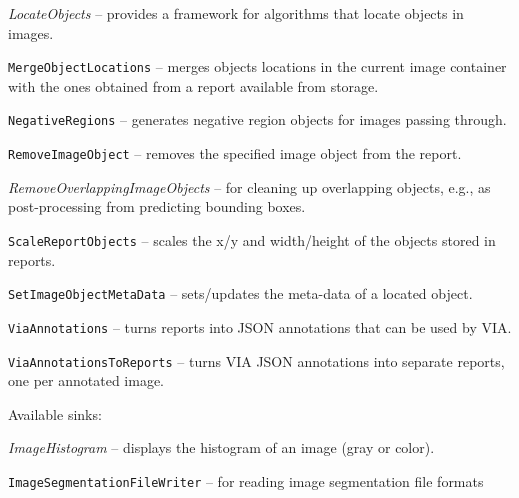 \documentclass[a4paper]{book}
\begin{document}
\begin{tight_itemize}
  \item \textit{LocateObjects} -- provides a framework for algorithms that
  locate objects in images.
  \item \texttt{MergeObjectLocations} -- merges objects locations
  in the current image container with the ones obtained from a report
  available from storage.
  \item \texttt{NegativeRegions} -- generates negative region objects
  for images passing through.
  \item \texttt{RemoveImageObject} -- removes the specified image object
  from the report.
  \item \textit{RemoveOverlappingImageObjects} -- for cleaning up
  overlapping objects, e.g., as post-processing from predicting bounding
  boxes.
  \item \texttt{ScaleReportObjects} -- scales the x/y and width/height
  of the objects stored in reports.
  \item \texttt{SetImageObjectMetaData} -- sets/updates the meta-data of
  a located object.
  \item \texttt{ViaAnnotations} -- turns reports into JSON annotations that
  can be used by VIA\cite{via}.
  \item \texttt{ViaAnnotationsToReports} -- turns VIA JSON annotations into
  separate reports, one per annotated image.
\end{tight_itemize}

\noindent Available sinks:
\begin{tight_itemize}
  \item \textit{ImageHistogram} -- displays the histogram of an image (gray or color).
  \item \texttt{ImageSegmentationFileWriter} -- for reading image segmentation file formats
\end{tight_itemize}


\end{document}
